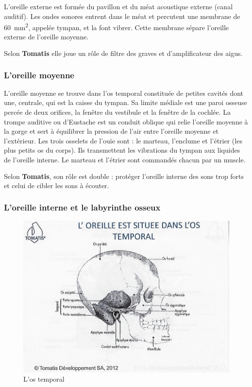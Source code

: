 L'oreille externe\autocite[ch. 8, pp. 319--321.]{marieb:biologie}
est formée du pavillon et du méat acoustique externe
	(canal auditif). Les ondes sonores entrent dans le méat et percutent
	une membrane de \SI{60}{\milli\metre\squared}, appelée tympan, et la font vibrer. 
	Cette membrane
	sépare l'oreille externe de l'oreille moyenne. 


        Selon \textbf{Tomatis} 
	elle joue un rôle de filtre des graves et d'amplificateur des aigus.




\subsubsection{L'oreille moyenne}

L'oreille moyenne se trouve dans l'os temporal constituée de petites
cavités dont une, centrale, qui est la caisse du tympan. Sa limite
médiale est une paroi osseuse percée de deux orifices, la fenêtre
du vestibule et la fenêtre de la cochlée. La trompe auditive ou d'Eustache
est un conduit oblique qui relie l'oreille moyenne à la gorge et sert
à équilibrer la pression de l'air entre l'oreille moyenne et l'extérieur.
Les trois osselets de l'ouïe sont : le marteau, l'enclume et l'étrier
(les plus petits os du corps). Ils transmettent les vibrations du
tympan aux liquides de l'oreille interne.
Le marteau et l'étrier sont commandés chacun par un muscle.


Selon \textbf{Tomatis}, son rôle est double : protéger l'oreille interne des sons
trop forts et celui de cibler les sons à écouter.

\subsubsection{L'oreille interne et le labyrinthe osseux}

\begin{figure}
	\centering
	\includegraphics[width=0.7\linewidth]{images/Loreilleostemporal_crane.jpg}
	\caption[L'os temporal]{L'os temporal}
	\label{fig:loreilleostemporal18}
\end{figure}

